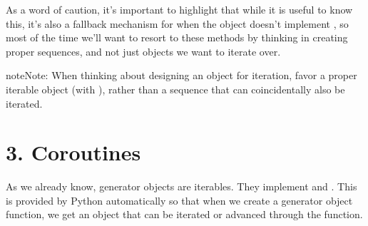 \documentclass[a4paper,10pt,english]{sphinxmanual}
\begin{document}
\begin{sphinxVerbatim}[commandchars=\\\{\}]
    
\PYG{p}{[}\PYG{p}{]}
\PYG{p}{[}\PYG{p}{]}
\end{sphinxVerbatim}

As a word of caution, it’s important to highlight that while it is useful to know this, it’s also
a fallback mechanism for when the object doesn’t implement , so most of the time
we’ll want to resort to these methods by thinking in creating proper sequences, and not just
objects we want to iterate over.

\begin{sphinxadmonition}{note}{Note:}
When thinking about designing an object for iteration, favor a proper
iterable object (with ), rather than a sequence that can
coincidentally also be iterated.
\end{sphinxadmonition}


\section{3. Coroutines}
\label{\detokenize{chapters/7_generators/index:coroutines}}
As we already know, generator objects are iterables. They implement  and
. This is provided by Python automatically so that when we create a generator
object function, we get an object that can be iterated or advanced through the 
function.
\end{document}

